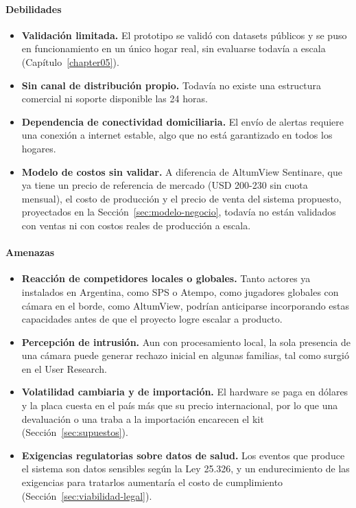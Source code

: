 \paragraph{Debilidades}
\begin{itemize}
    \item \textbf{Validación limitada.} El prototipo se validó con datasets públicos y se puso en funcionamiento en un único hogar real, sin evaluarse todavía a escala (Capítulo~\ref{chapter05}).
    \item \textbf{Sin canal de distribución propio.} Todavía no existe una estructura comercial ni soporte disponible las 24 horas.
    \item \textbf{Dependencia de conectividad domiciliaria.} El envío de alertas requiere una conexión a internet estable, algo que no está garantizado en todos los hogares.
    \item \textbf{Modelo de costos sin validar.} A diferencia de AltumView Sentinare, que ya tiene un precio de referencia de mercado (USD 200-230 sin cuota mensual), el costo de producción y el precio de venta del sistema propuesto, proyectados en la Sección~\ref{sec:modelo-negocio}, todavía no están validados con ventas ni con costos reales de producción a escala.
\end{itemize}

\paragraph{Amenazas}
\begin{itemize}
    \item \textbf{Reacción de competidores locales o globales.} Tanto actores ya instalados en Argentina, como SPS o Atempo, como jugadores globales con cámara en el borde, como AltumView, podrían anticiparse incorporando estas capacidades antes de que el proyecto logre escalar a producto.
    \item \textbf{Percepción de intrusión.} Aun con procesamiento local, la sola presencia de una cámara puede generar rechazo inicial en algunas familias, tal como surgió en el User Research.
    \item \textbf{Volatilidad cambiaria y de importación.} El hardware se paga en dólares y la placa cuesta en el país más que su precio internacional, por lo que una devaluación o una traba a la importación encarecen el kit (Sección~\ref{sec:supuestos}).
    \item \textbf{Exigencias regulatorias sobre datos de salud.} Los eventos que produce el sistema son datos sensibles según la Ley 25.326, y un endurecimiento de las exigencias para tratarlos aumentaría el costo de cumplimiento (Sección~\ref{sec:viabilidad-legal}).
\end{itemize}

